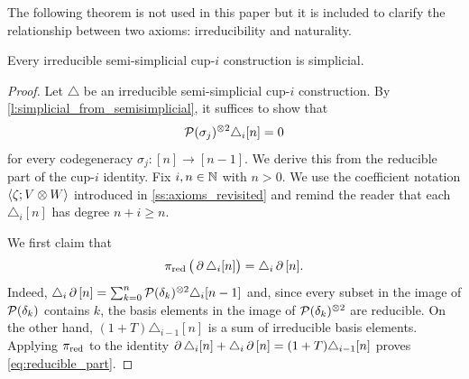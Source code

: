 The following theorem is not used in this paper but it is included to clarify the relationship between two axioms: irreducibility and naturality.

\begin{theorem}\label{t:irreducible_implies_simplicial}
	Every irreducible semi-simplicial \mbox{cup-$i$} construction is simplicial.
\end{theorem}

\begin{proof}
	Let $\triangle$ be an irreducible semi-simplicial \mbox{cup-$i$} construction.
	By \cref{l:simplicial_from_semisimplicial}, it suffices to show that
	\[
		\mathcal{P}(\sigma_j)^{\otimes 2}\triangle_i[n] = 0
	\]
	for every codegeneracy $\sigma_j \colon [n] \to [n-1]$.
	We derive this from the reducible part of the cup-$i$ identity.
	Fix $i,n \in \mathbb{N}$ with $n > 0$.
	We use the coefficient notation $\langle \zeta ; V \otimes W \rangle$ introduced in \cref{ss:axioms_revisited} and remind the reader that each $\triangle_i[n]$ has degree $n+i\geq n$.


	We first claim that
	\begin{equation}\label{eq:reducible_part}
		\operatorname{\pi_{\text{red}}}\big(\operatorname{\partial}\triangle_i[n]\big) = \triangle_i\operatorname{\partial}\,[n].
	\end{equation}
	Indeed, $\triangle_i\operatorname{\partial}\,[n] = \sum_{k=0}^{n} \mathcal{P}(\delta_k)^{\otimes 2}\triangle_i[n-1]$ and, since every subset in the image of $\mathcal{P}(\delta_k)$ contains $k$, the basis elements in the image of $\mathcal{P}(\delta_k)^{\otimes 2}$ are reducible.
	On the other hand, $(1+T)\triangle_{i-1}[n]$ is a sum of irreducible basis elements.
	Applying $\operatorname{\pi_{\text{red}}}$ to the identity $\operatorname{\partial}\triangle_i[n] + \triangle_i\operatorname{\partial}\,[n] = (1+T)\triangle_{i-1}[n]$ proves \eqref{eq:reducible_part}.


\end{proof}
